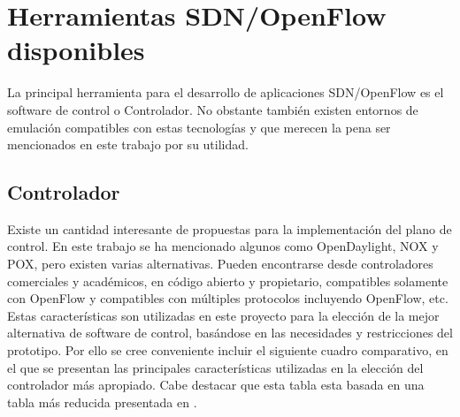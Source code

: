 
\section{Herramientas SDN/OpenFlow disponibles}

La principal herramienta para el desarrollo de aplicaciones SDN/OpenFlow es el software de control o Controlador. No obstante también existen entornos de emulación compatibles con estas tecnologías y que merecen la pena ser mencionados en este trabajo por su utilidad.

\subsection{Controlador}
Existe un cantidad interesante de propuestas para la implementaci\'on del plano de control. En este trabajo se ha mencionado algunos como OpenDaylight, NOX y POX, pero existen varias alternativas. Pueden encontrarse desde controladores comerciales y académicos, en código abierto y propietario, compatibles solamente con OpenFlow y compatibles con múltiples protocolos incluyendo OpenFlow, etc.\\   

Estas características son utilizadas en este proyecto para la elección de la mejor alternativa de software de control, basándose en las necesidades y restricciones del prototipo. Por ello se cree conveniente incluir el siguiente cuadro comparativo, en el que se presentan las principales características utilizadas en la elecci\'on del controlador m\'as apropiado. Cabe destacar que esta tabla esta basada en una tabla m\'as reducida presentada en \cite{StateOfArt1}. 

